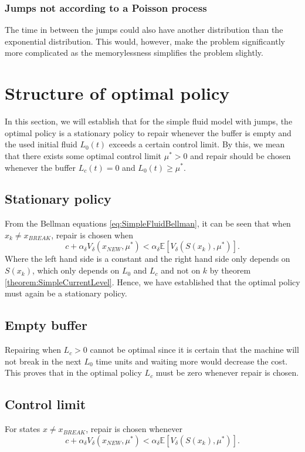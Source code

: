\documentclass[a4paper]{thesis}
\theoremstyle{definition}
\begin{document}
\subsubsection{Jumps not according to a Poisson process}
The time in between the jumps could also have another distribution than the exponential distribution.
This would, however, make the problem significantly more complicated as the memorylessness simplifies the problem slightly. \section{Structure of optimal policy}
In this section, we will establish that for the simple fluid model with jumps, the optimal policy is a stationary policy to repair whenever the buffer is empty and the used initial fluid $L_0(t)$ exceeds a certain control limit.
By this, we mean that there exists some optimal control limit $\mu^*>0$ and repair should be chosen whenever the buffer $L_c(t)=0$ and $L_0(t)\geq\mu^*$.

\subsection{Stationary policy}
From the Bellman equations \eqref{eq:SimpleFluidBellman}, it can be seen that when $x_k\neq x_{BREAK}$, repair is chosen when
\[ c+\alpha_\delta V_\delta(x_{NEW},\mu^*) <\alpha_\delta \mathbb{E}[V_\delta(S(x_k),\mu^*)]. \]
Where the left hand side is a constant and the right hand side only depends on $S(x_k)$, which only depends on $L_0$ and $L_c$ and not on $k$ by theorem \ref{theorem:SimpleCurrentLevel}.
Hence, we have established that the optimal policy must again be a stationary policy.

\subsection{Empty buffer}
Repairing when $L_c>0$ cannot be optimal since it is certain that the machine will not break in the next $L_0$ time units and waiting more would decrease the cost.
This proves that in the optimal policy $L_c$ must be zero whenever repair is chosen.

\subsection{Control limit}
For states $x\neq x_{BREAK}$, repair is chosen whenever
\begin{equation}\label{eq:SimpleFluidRepairCondition}
c+\alpha_\delta V_\delta(x_{NEW},\mu^*) <\alpha_\delta \mathbb{E}[V_\delta(S(x_k),\mu^*)].
\end{equation}
\end{document}
